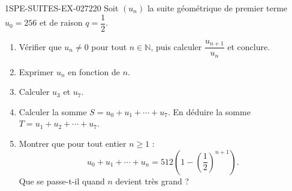 \begin{exercice}{1SPE-SUITES-EX-027}{2}{20}
Soit $(u_n)$ la suite géométrique de premier terme $u_0 = 256$ et de raison $q = \dfrac{1}{2}$.

\begin{enumerate}
  \item Vérifier que $u_n \neq 0$ pour tout $n \in \mathbb{N}$, puis calculer $\dfrac{u_{n+1}}{u_n}$ et conclure.

  \item Exprimer $u_n$ en fonction de $n$.

  \item Calculer $u_3$ et $u_7$.

  \item Calculer la somme $S = u_0 + u_1 + \cdots + u_7$. En déduire la somme $T = u_1 + u_2 + \cdots + u_7$.

  \item Montrer que pour tout entier $n \geq 1$ :
  \[
    u_0 + u_1 + \cdots + u_n = 512\left(1 - \left(\frac{1}{2}\right)^{n+1}\right).
  \]
  Que se passe-t-il quand $n$ devient très grand ?
\end{enumerate}
\end{exercice}
